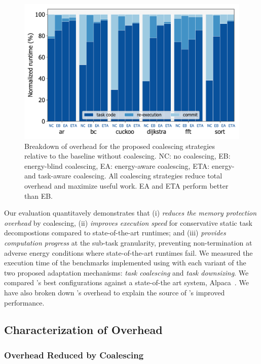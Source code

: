 \begin{figure}
	\centering
	\includegraphics[width=0.5\columnwidth]{figures/coalEfficiency}
    \caption{Breakdown of overhead for the proposed coalescing strategies
relative to the baseline without coalescing.
NC: no coalescing, EB: energy-blind coalescing, EA: energy-aware coalescing, ETA:
energy- and task-aware coalescing. All coalescing strategies reduce total
overhead and maximize useful work. EA and ETA perform better than EB.
}
	\label{fig:overallOverheadBreakdown}
\end{figure}

Our evaluation quantitavely demonstrates that \sys (i) \emph{reduces the memory
protection overhead} by coalescing, (ii) \emph{improves execution speed} for
conservative static task decompostions compared to state-of-the-art runtimes; %
and (iii) \emph{provides computation progress} at the sub-task granularity,
preventing non-termination at adverse energy conditions where state-of-the-art
runtimes fail. We measured the execution time of the benchmarks implemented
using \sys with each variant of the two proposed adaptation mechanisms:
\emph{task coalescing} and \emph{task downsizing}. We compared \sys's best
configurations against a state-of-the art system, Alpaca~\cite{alpaca}. We have
also broken down \sys's overhead to explain the source of \sys's improved
performance.

\subsection{Characterization of Overhead}
\label{sec:coala_overhead}


\subsubsection{Overhead Reduced by Coalescing}
\label{sec:overhead-coalescing}

